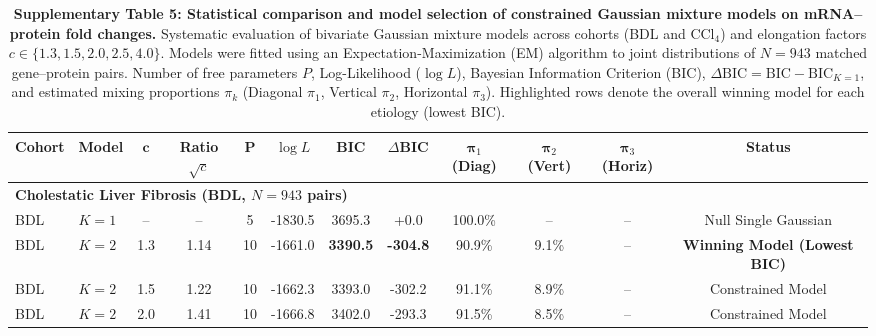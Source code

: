 
\begin{landscape}
\thispagestyle{empty}
\begin{table}[p]
\centering
\caption{\textbf{Supplementary Table 5: Statistical comparison and model selection of constrained Gaussian mixture models on mRNA--protein fold changes.} Systematic evaluation of bivariate Gaussian mixture models across cohorts (BDL and CCl$_4$) and elongation factors $c \in \{1.3, 1.5, 2.0, 2.5, 4.0\}$. Models were fitted using an Expectation-Maximization (EM) algorithm to joint distributions of $N = 943$ matched gene--protein pairs. Number of free parameters $P$, Log-Likelihood ($\log L$), Bayesian Information Criterion (BIC), $\Delta\text{BIC} = \text{BIC} - \text{BIC}_{K=1}$, and estimated mixing proportions $\pi_k$ (Diagonal $\pi_1$, Vertical $\pi_2$, Horizontal $\pi_3$). Highlighted rows denote the overall winning model for each etiology (lowest BIC).}
\label{tab:suppl_table_5}
\vspace{0.3cm}
\small
\setlength{\tabcolsep}{6pt}
\renewcommand{\arraystretch}{1.15}
\begin{tabular*}{\linewidth}{@{\extracolsep{\fill}} llcccccccccc}
\toprule
\textbf{Cohort} & \textbf{Model} & $\mathbf{c}$ & \textbf{Ratio} $\sqrt{c}$ & $\mathbf{P}$ & $\log L$ & \textbf{BIC} & $\Delta\mathbf{BIC}$ & $\boldsymbol{\pi}_1$ \textbf{(Diag)} & $\boldsymbol{\pi}_2$ \textbf{(Vert)} & $\boldsymbol{\pi}_3$ \textbf{(Horiz)} & \textbf{Status} \\
\midrule
\multicolumn{12}{l}{\textbf{Cholestatic Liver Fibrosis (BDL, $N = 943$ pairs)}} \\
BDL & $K=1$ & -- & -- & 5 & -1830.5 & 3695.3 & +0.0 & 100.0\% & -- & -- & Null Single Gaussian \\
\rowcolor[HTML]{E8F5E9} BDL & $K=2$ & 1.3 & 1.14 & 10 & -1661.0 & \textbf{3390.5} & \textbf{-304.8} & 90.9\% & 9.1\% & -- & \textbf{Winning Model (Lowest BIC)} \\
BDL & $K=2$ & 1.5 & 1.22 & 10 & -1662.3 & 3393.0 & -302.2 & 91.1\% & 8.9\% & -- & Constrained Model \\
BDL & $K=2$ & 2.0 & 1.41 & 10 & -1666.8 & 3402.0 & -293.3 & 91.5\% & 8.5\% & -- & Constrained Model \\

\end{tabular*}
\end{table}
\end{landscape}
